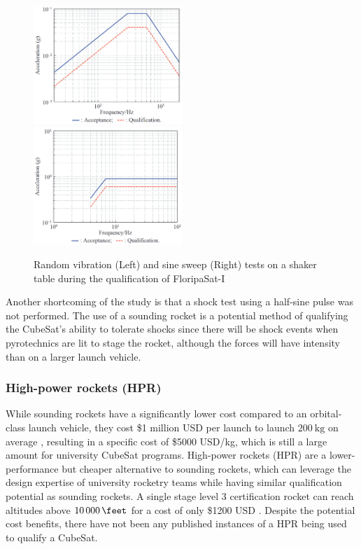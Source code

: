 \documentclass[a4paper,11pt]{article}
\begin{document}
\begin{figure}[H]
  \includegraphics[width=0.5\textwidth]{images/floripa-random-spectrum.png}
  \includegraphics[width=0.5\textwidth]{images/floripa-sinusoid.png}
  \label{fig:shaker}
  \caption{Random vibration (Left) and sine sweep (Right) tests on a shaker table during the qualification of FloripaSat-I \cite{9316404}}
\end{figure}

Another shortcoming of the study is that a shock test using a half-sine pulse was not performed. The use of a sounding rocket is a potential method of qualifying the CubeSat's ability to tolerate shocks since there will be shock events when pyrotechnics are lit to stage the rocket, although the forces will have intensity than on a larger launch vehicle.

\subsubsection{High-power rockets (HPR)}
While sounding rockets have a significantly lower cost compared to an orbital-class launch vehicle, they cost \$1 million USD per launch to launch $\SI{200}{\kilo\gram}$ on average \cite{jurist2009COTS}, resulting in a specific cost of \$5000 USD/kg, which is still a large amount for university CubeSat programs. High-power rockets (HPR) are a lower-performance but cheaper alternative to sounding rockets, which can leverage the design expertise of university rocketry teams while having similar qualification potential as sounding rockets. A single stage level 3 certification rocket can reach altitudes above $\SI{10000}{\feet}$ \cite{canepa2005modern} for a cost of only \$1200 USD \cite{canepa2005modern}. Despite the potential cost benefits, there have not been any published instances of a HPR being used to qualify a CubeSat.
\end{document}
